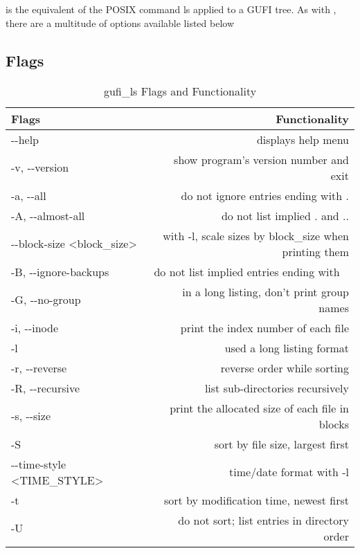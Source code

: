 \section{\gufils}
\gufils is the equivalent of the POSIX command ls applied to a GUFI
tree. As with \gufifind, there are a multitude of options available
listed below

\subsection{Flags}
\begin{table} [h!]
  \centering
  \begin{tabular}{| l | r |}
    \hline
    Flags & Functionality \\
    \hline
    -{}-help & displays help menu \\
    \hline
    -v, -{}-version & show program's version number and exit \\
    \hline
    -a, -{}-all & do not ignore entries ending with . \\
    \hline
    -A, -{}-almost-all & do not list implied . and .. \\
    \hline
    -{}-block-size \textless block\_size\textgreater & with -l, scale sizes by block\_size when printing them \\
    \hline
    -B, -{}-ignore-backups & do not list implied entries ending with ~ \\
    \hline
    -G, -{}-no-group & in a long listing, don't print group names \\
    \hline
    -i, -{}-inode & print the index number of each file \\
    \hline
    -l & used a long listing format \\
    \hline
    -r, -{}-reverse & reverse order while sorting \\
    \hline
    -R, -{}-recursive & list sub-directories recursively \\
    \hline
    -s, -{}-size & print the allocated size of each file in blocks \\
    \hline
    -S & sort by file size, largest first \\
    \hline
    -{}-time-style \textless TIME\_STYLE\textgreater & time/date format with -l \\
    \hline
    -t & sort by modification time, newest first \\
    \hline
    -U & do not sort; list entries in directory order \\
    \hline
  \end{tabular}
  \caption{\label{fig:gufi_ls flags}{gufi\_ls Flags and Functionality}}
\end{table}

